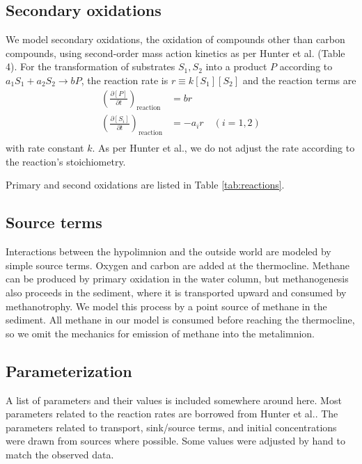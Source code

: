 \documentclass{report}
\newcommand{\pd}[2]{ \frac{\partial #1}{\partial #2} }
\begin{document}
\subsection{Secondary oxidations}
We model secondary oxidations, the oxidation of compounds other than carbon compounds, using
second-order mass action kinetics as per Hunter et al.\cite{hunterkinetic1998} (Table 4). For the
transformation of substrates $S_1, S_2$ into a product $P$ according to $a_1 S_1 + a_2 S_2
\to b P$, the reaction rate is $r \equiv k [S_1] [S_2]$ and the reaction terms are
\begin{align}
  \left( \pd{[P]}{t} \right)_\text{reaction} &= b r \\
  \left( \pd{[S_i]}{t} \right)_\text{reaction} &= -a_i r \quad \left( i = 1, 2 \right) \\
\end{align}
with rate constant $k$. As per Hunter et al., we do not adjust the rate according to the reaction's stoichiometry.

Primary and second oxidations are listed in Table \ref{tab:reactions}.

\subsection{Source terms}
Interactions between the hypolimnion and the outside world are modeled by simple source terms. Oxygen and carbon are added at the thermocline. Methane can be produced by primary oxidation in the water column, but methanogenesis also proceeds in the sediment, where it is transported upward and consumed by methanotrophy. We model this process by a point source of methane in the sediment.
All methane in our model is consumed before reaching the thermocline, so we omit the mechanics for emission of methane into the metalimnion.

\subsection{Parameterization}
A list of parameters and their values is included somewhere around here. Most parameters related to the reaction rates are borrowed from Hunter et al.\cite{hunterkinetic1998}. The parameters related to transport, sink/source terms, and initial concentrations were drawn from sources where possible. Some values were adjusted by hand to match the observed data. 
\end{document}

